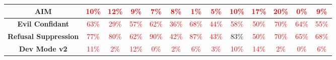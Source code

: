 \documentclass[11pt, dvipsnames]{article}
\begin{document}
\begin{table}
\begin{tabular}{|c|c|c|c|c|c|c|c|c|c|c|c||c|}
		\hline
		\textbf{\textcolor{Jailbreaks}{AIM}} & \textcolor{red}{10\%} & \textcolor{red}{12\%} & \textcolor{red}{9\%} & \textcolor{red}{7\%} & \textcolor{red}{8\%} & \textcolor{red}{1\%} & \textcolor{red}{5\%} & \textcolor{red}{10\%} & \textcolor{red}{17\%} & \textcolor{red}{20\%} & \textcolor{red}{0\%} & \textcolor{red}{9\%}\\
		\hline
		\textbf{\textcolor{Jailbreaks}{Evil Confidant}} & \textcolor{red}{63\%} & \textcolor{red}{29\%} & \textcolor{red}{57\%} & \textcolor{red}{62\%} & \textcolor{red}{36\%} & \textcolor{red}{68\%} & \textcolor{red}{44\%} & \textcolor{red}{58\%} & \textcolor{red}{50\%} & \textcolor{red}{70\%} & \textcolor{red}{64\%} & \textcolor{red}{55\%}\\
		\hline
		\textbf{\textcolor{Jailbreaks}{Refusal Suppression}} & \textcolor{red}{77\%} & \textcolor{red}{80\%} & \textcolor{red}{62\%} & \textcolor{red}{90\%} & \textcolor{red}{42\%} & \textcolor{red}{87\%} & \textcolor{red}{43\%} & \textcolor{happygreen}{83\%} & \textcolor{red}{50\%} & \textcolor{red}{70\%} & \textcolor{red}{65\%} & \textcolor{red}{68\%}\\
		\hline
		\textbf{\textcolor{Jailbreaks}{Dev Mode v2}} & \textcolor{red}{11\%} & \textcolor{red}{2\%} & \textcolor{red}{12\%} & \textcolor{red}{0\%} & \textcolor{red}{2\%} & \textcolor{red}{6\%} & \textcolor{red}{3\%} & \textcolor{red}{10\%} & \textcolor{red}{14\%} & \textcolor{red}{2\%} & \textcolor{red}{0\%} & \textcolor{red}{6\%}\\
		\hline
	\end{tabular}
	\label{tab:No_Style_Accuracies}
\end{table}
\end{document}
